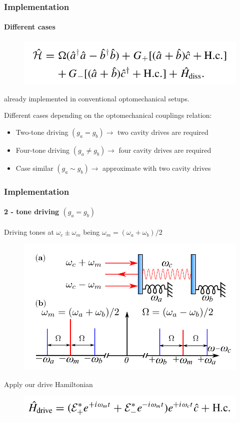 \documentclass[aspectratio=43]{beamer}
\begin{document}
\begin{frame}

	\frametitle{Implementation}
	\framesubtitle{Different cases}
	
	\begin{figure}
		\includegraphics[width = 7.5 cm]{plots/hamiltonian_4.png}
	\end{figure}
	
	already implemented in conventional optomechanical setups.
	
	\vspace{0.5 cm}

	Different cases depending on the optomechanical couplings relation:

	\begin{itemize}
		\item Two-tone driving $(g_{a} = g_{b}) \longrightarrow$ two cavity drives are required 
		\item Four-tone driving $(g_{a} \neq g_{b}) \longrightarrow$ four cavity drives are required 
		\item Case similar $(g_{a} \sim g_{b}) \longrightarrow$ approximate with two cavity drives
	\end{itemize}	

\end{frame}

\begin{frame}

	\frametitle{Implementation}
	\framesubtitle{2 - tone driving $(g_{a} = g_{b})$}
	
	Driving tones at $\omega_{c} \pm \omega_{m}$ being  $\omega_{m} = (\omega_{a} + \omega_{b}) / 2$
	
	\begin{figure}
		\includegraphics[width = 7 cm]{plots/plot_2_tone.png}
	\end{figure}	

	Apply our drive Hamiltonian

	\begin{figure}
		\includegraphics[width = 7 cm]{plots/hamiltonian_2_tone.png}
	\end{figure}

\end{frame}
\end{document}
